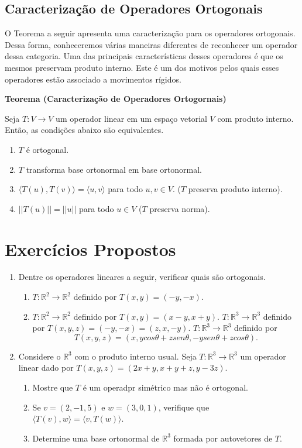 \subsection{Caracterização de Operadores Ortogonais}

O Teorema a seguir apresenta uma caracterização para os operadores ortogonais. Dessa forma, conheceremos várias maneiras diferentes de reconhecer um operador dessa categoria. Uma das principais características desses operadores é que os mesmos preservam produto interno. Este é um dos motivos pelos quais esses operadores estão associado a movimentos rígidos.


\vspace{0.7cm}
 {\textbf{Teorema (Caracterização de Operadores Ortogornais) }

 Seja $T:  V \rightarrow V$  um operador linear em um espaço vetorial $V$ com  produto interno.  Então, as condições abaixo são equivalentes.
\begin{enumerate}
\item $T$ é ortogonal.
\item $T$ transforma base ortonormal em base ortonormal.
\item   $\langle T(u), T(v) \rangle=\langle u, v \rangle$ para todo $u, v \in V$. ($T$  preserva produto interno).
\item   $||T(u)||=||u||$  para todo $u \in V$ ($T$  preserva norma).
\end{enumerate}

\section{Exercícios Propostos}
\begin{enumerate}


\item Dentre os operadores lineares a  seguir, verificar quais são ortogonais.
\begin{enumerate}
\item  $T: \mathbb{R}^2  \rightarrow  \mathbb{R}^2$  definido por $T(x,y)=(-y, -x)$.
\item $T: \mathbb{R}^2  \rightarrow  \mathbb{R}^2$  definido por $T(x,y)=(x-y, x+y)$.
$T: \mathbb{R}^3  \rightarrow  \mathbb{R}^3$  definido por $T(x,y,z)=(-y, -x)=(z,x,-y)$.
$T: \mathbb{R}^3  \rightarrow  \mathbb{R}^3$  definido por $$T(x,y,z)=(x, ycos\theta+zsen\theta, -ysen\theta+zcos\theta).$$
\end{enumerate}


\item Considere o $ \mathbb{R}^3 $ com o produto interno usual. Seja $T: \mathbb{R}^3  \rightarrow  \mathbb{R}^3$ um operador linear dado por $T(x,y,z)=(2x+y, x+y+z, y-3z)$.
\begin{enumerate}
\item Mostre que $T$ é um operadpr simétrico mas não é ortogonal.
\item Se $v=(2,-1,5)$ e $w=(3,0,1)$, verifique que $\langle T(v), w \rangle=\langle v, T(w) \rangle$.
\item Determine uma base ortonormal de $ \mathbb{R}^3 $  formada por  autovetores de $T$.
\end{enumerate}



\end{enumerate}}
